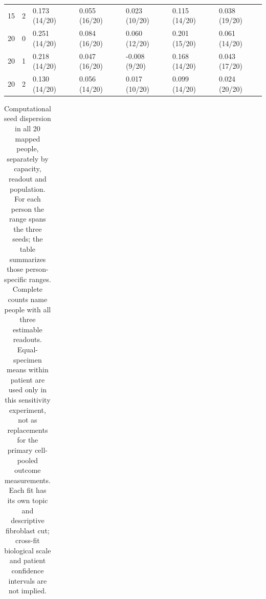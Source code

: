 \documentclass[10pt,a4paper]{article}
\begin{document}
{{\begin{longtable}{@{}p{9mm}p{11mm}p{29mm}p{29mm}p{29mm}p{29mm}p{29mm}@{}}
15 & 2 & 0.173 (14/20)\newline [-0.395, 0.640] & 0.055 (16/20)\newline [-0.063, 0.239] & 0.023 (10/20)\newline [-0.389, 0.190] & 0.115 (14/20)\newline [-0.409, 0.565] & 0.038 (19/20)\newline [-0.006, 0.261]\\
20 & 0 & 0.251 (14/20)\newline [-0.430, 1.123] & 0.084 (16/20)\newline [-0.143, 0.542] & 0.060 (12/20)\newline [-0.445, 0.433] & 0.201 (15/20)\newline [-0.521, 1.143] & 0.061 (14/20)\newline [-0.040, 0.283]\\
20 & 1 & 0.218 (14/20)\newline [-0.562, 0.758] & 0.047 (16/20)\newline [-0.097, 0.269] & -0.008 (9/20)\newline [-0.581, 0.247] & 0.168 (14/20)\newline [-0.553, 0.699] & 0.043 (17/20)\newline [-0.090, 0.259]\\
20 & 2 & 0.130 (14/20)\newline [-0.414, 0.775] & 0.056 (14/20)\newline [-0.122, 0.252] & 0.017 (10/20)\newline [-0.412, 0.180] & 0.099 (14/20)\newline [-0.431, 0.672] & 0.024 (20/20)\newline [0.004, 0.214]\\
\end{longtable}
}
\clearpage
{\setlength{\tabcolsep}{2pt}
\begin{longtable}{@{}p{10mm}p{32mm}p{40mm}p{24mm}p{27mm}p{30mm}@{}}
\caption{Computational seed dispersion in all 20 mapped people, separately by capacity, readout and population. For each person the range spans the three seeds; the table summarizes those person-specific ranges. Complete counts name people with all three estimable readouts. Equal-specimen means within patient are used only in this sensitivity experiment, not as replacements for the primary cell-pooled outcome measurements. Each fit has its own topic and descriptive fibroblast cut; cross-fit biological scale and patient confidence intervals are not implied.}\label{tab:p1qualityranges}\\

\end{longtable}}}
\end{document}
